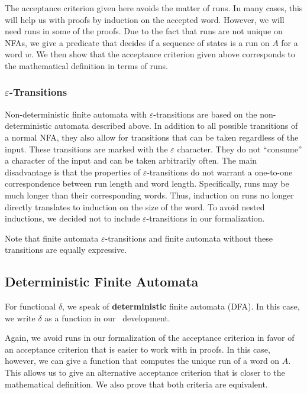 The acceptance criterion given here avoids the matter of runs.
In many cases, this will help us with proofs by induction on the accepted word.
However, we will need runs in some of the proofs.
Due to the fact that runs are not unique on NFAs, 
we give a predicate that decides if a sequence of states is a run on $A$ for a word $w$.
We then show that the acceptance criterion given above corresponds to the mathematical definition in terms of runs.



\subsubsection{$\varepsilon$-Transitions}
Non-deterministic finite automata with $\varepsilon$-transitions are based on the non-deterministic automata described above.
In addition to all possible transitions of a normal NFA, they also allow for transitions that can be taken regardless of the input. 
These transitions are marked with the $\varepsilon$ character. 
They do not ``consume'' a character of the input and can be taken arbitrarily often.
The main disadvantage is that the properties of $\varepsilon$-transitions do not warrant a one-to-one correspondence between
run length and word length. 
Specifically, runs may be much longer than their corresponding words. 
Thus, induction on runs no longer directly translates to induction on the size of the word.
To avoid nested inductions, we decided not to include $\varepsilon$-transitions in our formalization.

Note that finite automata $\varepsilon$-transitions and finite automata without these transitions are equally expressive. 

\subsection{Deterministic Finite Automata}
For functional $\delta$, we speak of \textbf{deterministic} finite automata (DFA). 
In this case, we write $\delta$ as a function in our \coq\ development. 



Again, we avoid runs in our formalization of the acceptance criterion in favor of an acceptance criterion that is easier to work with in proofs.
In this case, however, we can give a function that computes the unique run of a word on $A$.
This allows us to give an alternative acceptance criterion that is closer to the mathematical definition.
We also prove that both criteria are equivalent.

